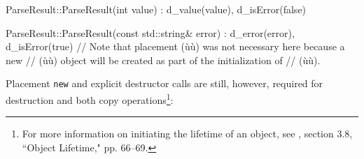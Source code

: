 %
\begin{emcppslisting}[emcppsbatch=e6]
ParseResult::ParseResult(int value) : d_value(value), d_isError(false)
{
}

ParseResult::ParseResult(const std::string& error)
    : d_error(error), d_isError(true)
    // Note that placement (ù{}ù) was not necessary here because a new
    // (ù{}ù) object will be created as part of the initialization of
    // (ù{}ù).
{
}
\end{emcppslisting}


\noindent Placement \lstinline!new! and explicit destructor calls are still, however,
required for destruction and both copy operations{\cprotect\footnote{For
more information on initiating the lifetime of an object, see \cite{iso14}, section 3.8, ``Object Lifetime," pp. 66--69.}}:

